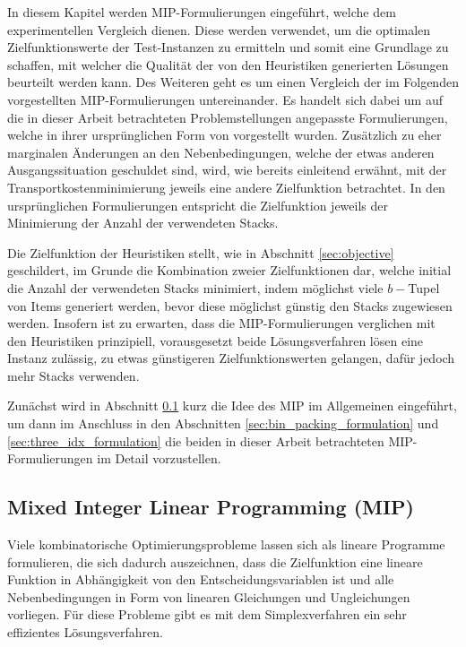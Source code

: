In diesem Kapitel werden MIP-Formulierungen eingeführt, welche dem experimentellen Vergleich dienen.
Diese werden verwendet, um die optimalen Zielfunktionswerte der Test-Instanzen zu ermitteln und somit eine Grundlage zu schaffen, mit welcher die Qualität der von den Heuristiken generierten Lösungen beurteilt werden kann. Des Weiteren geht es um einen Vergleich der im Folgenden vorgestellten MIP-Formulierungen untereinander.
Es handelt sich dabei um auf die in dieser Arbeit betrachteten Problemstellungen angepasste Formulierungen,
welche in ihrer ursprünglichen Form von \citet{Le2016} vorgestellt wurden.
Zusätzlich zu eher marginalen Änderungen an den Nebenbedingungen, welche der etwas anderen Ausgangssituation geschuldet sind,
wird, wie bereits einleitend erwähnt, mit der Transportkostenminimierung jeweils eine andere Zielfunktion betrachtet.
In den ursprünglichen Formulierungen entspricht die Zielfunktion jeweils der Minimierung der Anzahl der verwendeten Stacks.

Die Zielfunktion der Heuristiken stellt, wie in Abschnitt \ref{sec:objective} geschildert, im Grunde die Kombination
zweier Zielfunktionen dar, welche initial die Anzahl der verwendeten Stacks minimiert, indem möglichst viele
$b-$Tupel von Items generiert werden, bevor diese möglichst günstig den Stacks zugewiesen werden.
Insofern ist zu erwarten, dass die MIP-Formulierungen verglichen mit den Heuristiken prinzipiell,
vorausgesetzt beide Lösungsverfahren lösen eine Instanz zulässig, zu etwas günstigeren Zielfunktionswerten gelangen,
dafür jedoch mehr Stacks verwenden.

Zunächst wird in Abschnitt \ref{sec:mip_definition} kurz die Idee des MIP im Allgemeinen
eingeführt, um dann im Anschluss in den Abschnitten \ref{sec:bin_packing_formulation} und \ref{sec:three_idx_formulation} die beiden in dieser Arbeit betrachteten MIP-Formulierungen im Detail vorzustellen.

\subsection{Mixed Integer Linear Programming (MIP)}
\label{sec:mip_definition}

Viele kombinatorische Optimierungsprobleme lassen sich als lineare Programme formulieren, die sich dadurch
auszeichnen, dass die Zielfunktion eine lineare Funktion in Abhängigkeit von den Entscheidungsvariablen ist
und alle Nebenbedingungen in Form von linearen Gleichungen und Ungleichungen vorliegen. Für diese Probleme gibt es mit dem Simplexverfahren ein sehr effizientes Lösungsverfahren.\cite{Knust2017}

